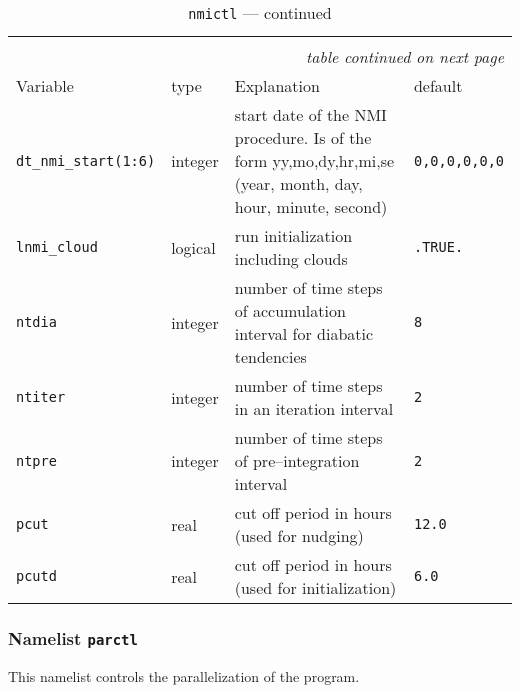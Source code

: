 \begin{longtable}{l@{\extracolsep\fill}lp{7cm}p{3.5cm}}\hline\hline
\caption[Namelist {\tt nmictl}]{Namelist 
  {\tt nmictl}}\\\hline\label{tabnmictl}
\endfirsthead
\caption[]{{\tt nmictl} --- continued}\\\hline
\endhead
\hline\multicolumn{4}{r}{\slshape table continued on next page}\\
\endfoot
\hline %
\endlastfoot
Variable & type & Explanation & default \\\hline
{\tt dt\_nmi\_start(1:6)}\index{namelist variables!dt\_nmi\_start}
 & integer & start date of the NMI procedure.
  Is of the form yy,mo,dy,hr,mi,se (year, month,
 day, hour, minute, second)& {\tt 0,0,0,0,0,0}\\
{\tt lnmi\_cloud}\index{namelist variables!lnmi\_cloud}
 & logical & run initialization including clouds &
  {\tt .TRUE.} \\
{\tt ntdia}\index{namelist variables!ntdia}
 & integer & number of time steps of accumulation interval
  for diabatic tendencies & {\tt 8}\\
{\tt ntiter}\index{namelist variables!ntiter}
 & integer & number of time steps in an iteration interval
  & {\tt 2}\\
{\tt ntpre}\index{namelist variables!ntpre}
 & integer & number of time steps of pre--integration
  interval & {\tt 2} \\
{\tt pcut}\index{namelist variables!pcut}
 & real & cut off period in hours (used for nudging)
  & {\tt 12.0} \\
{\tt pcutd}\index{namelist variables!pcutd}
 & real & cut off period in hours (used for
  initialization) & {\tt 6.0} \\\hline
\end{longtable}


\subsubsection{Namelist {\tt parctl}}

This namelist controls the parallelization of the \echam{} program.

\setlength{\LTcapwidth}{\textwidth}
\setlength{\LTleft}{0pt}\setlength{\LTright}{0pt}

